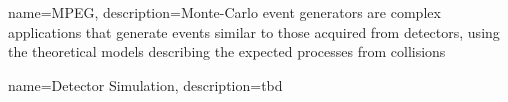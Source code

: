 
{
    name=MPEG,
    description={Monte-Carlo event generators are complex applications that generate events similar to those acquired from detectors, using the theoretical models describing the expected processes from collisions}
}

{
    name={Detector Simulation},
    description={tbd}
}
